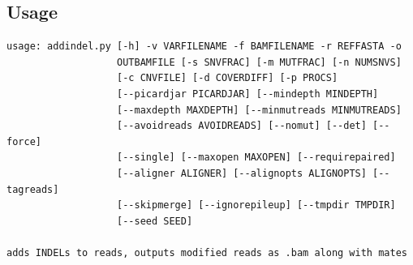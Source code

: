 \documentclass[letterpaper,11pt]{article}
\begin{document}
\subsection{Usage}
\begin{verbatim}
usage: addindel.py [-h] -v VARFILENAME -f BAMFILENAME -r REFFASTA -o
                   OUTBAMFILE [-s SNVFRAC] [-m MUTFRAC] [-n NUMSNVS]
                   [-c CNVFILE] [-d COVERDIFF] [-p PROCS]
                   [--picardjar PICARDJAR] [--mindepth MINDEPTH]
                   [--maxdepth MAXDEPTH] [--minmutreads MINMUTREADS]
                   [--avoidreads AVOIDREADS] [--nomut] [--det] [--force]
                   [--single] [--maxopen MAXOPEN] [--requirepaired]
                   [--aligner ALIGNER] [--alignopts ALIGNOPTS] [--tagreads]
                   [--skipmerge] [--ignorepileup] [--tmpdir TMPDIR]
                   [--seed SEED]

adds INDELs to reads, outputs modified reads as .bam along with mates


\end{verbatim}
\end{document}

